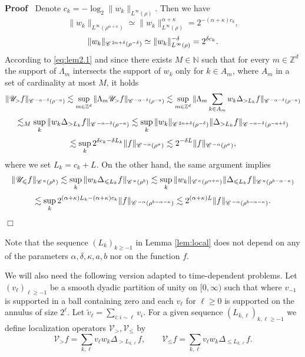 \documentclass[a4paper,11pt]{article}
\renewcommand{\geq}{\geqslant}
\newenvironment{proof}{\noindent\textbf{Proof\ }}{\hspace*{\fill}$\Box$\medskip}
\numberwithin{equation}{section}
\newcommand{\CC}{\mathscr{C} \hspace{.1em}}
\newcommand{\UU}{\mathscr{U}}
\newcommand{\VV}{\mathscr{V}}
\newcommand{\N}{\mathbb{N}}
\newcommand{\8}{\infty}
\begin{document}
\begin{proof}
  Denote $c_k = - \log_2 \|  w_k \|_{L^{\infty} (\rho)}$. Then we have
  \[ \|  w_k \|_{L^{\infty} (\rho^{\alpha+\kappa})} \simeq \|  w_k \|_{L^{\infty}
     (\rho)}^{\alpha+\kappa} = 2^{- (\alpha+\kappa) c_k}, \]
  \[ \|  w_k \|_{\CC^{2 \alpha + \delta} (\rho^{- \delta})} \simeq \|  w_k
     \|_{L^{\infty} (\rho)}^{- \delta} = 2^{\delta c_k} . \]
According to \eqref{eq:lem2.1}    and since there exists $M\in\N$ such that for every $m\in\mathbb{Z}^{d}$  the support of $\Lambda_{m}$ intersects the support of $w_{k}$ only for $k\in A_{m}$, where $A_{m}$ in a set of cardinality at most $M$, it holds 
  \[ \| \UU_{>} f \|_{\CC^{- \alpha - \delta} (\rho^{- a})} \lesssim
     \sup_{m\in\mathbb{Z}^{d}}\|\Lambda_{m}\UU_{>}f\|_{\CC^{- \alpha - \delta} (\rho^{- a})}\lesssim \sup_{m\in\mathbb{Z}^{d}}\|\Lambda_{m}\sum_{k\in A_{m}}w_{k}\Delta_{>L_{k}}f\|_{\CC^{- \alpha - \delta} (\rho^{- a})}\]
    \[  \lesssim_{M} \sup_{k}\|  w_k \Delta_{> L_k} f \|_{\CC^{- \alpha - \delta} (\rho^{- a})}
     \lesssim \sup_k \|  w_k \|_{\CC^{2 \alpha + \delta} (\rho^{-\delta})}
     \| \Delta_{> L_k} f \|_{\CC^{- \alpha - \delta} (\rho^{-a+\delta})} \]
  \[ \lesssim \sup_k 2^{\delta c_k - \delta L_k} \| f \|_{\CC^{- \alpha}
     (\rho^{\sigma})} \lesssim 2^{- \delta L} \| f \|_{\CC^{- \alpha}
     (\rho^{\sigma})}, \]
where we set $L_k =  c_k+ L$.
  On the other hand, the same argument implies
  \[ \| \UU_{\leqslant} f \|_{\CC^{\kappa} (\rho^b)} \lesssim \sup_k
     \|  w_k \Delta_{\leqslant L_k} f \|_{\CC^{\kappa} (\rho^b)} \lesssim
     \sup_k \|  w_k \|_{\CC^{\kappa} (\rho^{\alpha+\kappa})} \| \Delta_{\leqslant
     L_k} f \|_{\CC^{\kappa} (\rho^{b-\alpha-\kappa})} \]
  \[ \lesssim \sup_k 2^{(\alpha + \kappa) L_k - (\alpha+\kappa) c_k} \| f
     \|_{\CC^{- \alpha} (\rho^{b-\alpha-\kappa})} \lesssim 2^{(\alpha+\kappa) L} \| f \|_{\CC^{- \alpha}
     (\rho^{b-\alpha-\kappa})}.\]
\end{proof}

\begin{remark}
     Note that the sequence $(L_k)_{k\geq -1}$ in Lemma \ref{lem:local} does not depend on any of the parameters $\alpha,\delta,\kappa,a,b$ nor on the function $f$.

\end{remark}





We will also need the following version adapted to time-dependent problems. Let $(v_{\ell})_{\ell\geq -1}$ be a smooth dyadic partition of unity on $[0,\8)$ such that where $v_{-1}$ is supported in a ball containing zero and each $v_\ell$ for $\ell\geq0$ is supported on the annulus of size $2^\ell$. 
Let $\tilde v_{\ell}=\sum_{i:i\sim\ell}v_{i}$.
 For a given sequence $(L_{k,\ell})_{k,\ell\geq -1}$  we define localization operators $\VV_{>},
\VV_{\leqslant}$  by
\begin{equation}\label{eq:locd}
\VV_{>} f = \sum_{k,\ell} v_{\ell}w_k \Delta_{> L_{k,\ell}} f, \qquad
   \VV_{\leqslant} f = \sum_{k,\ell} v_{\ell}w_k \Delta_{\leqslant L_{k,\ell}} f.
   \end{equation}
\end{document}

